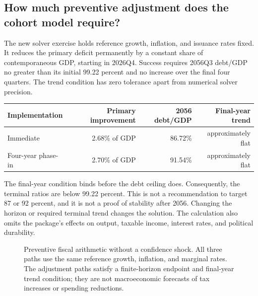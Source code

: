 \documentclass[11pt]{article}
\begin{document}
\subsection*{How much preventive adjustment does the cohort model require?}

The new solver exercise holds reference growth, inflation, and issuance rates fixed. It
reduces the primary deficit permanently by a constant share of contemporaneous GDP,
starting in 2026Q4. Success requires 2056Q3 debt/GDP no greater than its initial
99.22 percent and no increase over the final four quarters. The trend condition has zero
tolerance apart from numerical solver precision.

\begin{center}
\begin{tabular}{lrrr}
\toprule
Implementation & Primary improvement & 2056 debt/GDP & Final-year trend\\
\midrule
Immediate & 2.68\% of GDP & 86.72\% & approximately flat\\
Four-year phase-in & 2.70\% of GDP & 91.54\% & approximately flat\\
\bottomrule
\end{tabular}
\end{center}
The final-year condition binds before the debt ceiling does. Consequently, the terminal
ratios are below 99.22 percent. This is not a recommendation to target 87 or 92 percent,
and it is not a proof of stability after 2056. Changing the horizon or required terminal
trend changes the solution. The calculation also omits the package's effects on output,
taxable income, interest rates, and political durability.

\begin{figure}[htbp]
\centering
{}
\caption{Preventive fiscal arithmetic without a confidence shock. All three paths use
the same reference growth, inflation, and marginal rates. The adjustment paths satisfy
a finite-horizon endpoint and final-year trend condition; they are not macroeconomic
forecasts of tax increases or spending reductions.}
\label{fig:no-shock}
\end{figure}
\FloatBarrier
\end{document}
